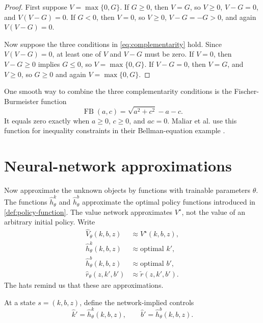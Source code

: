\documentclass[11pt]{article}
\newcommand{\1}{\mathbf{1}}
\begin{document}
\begin{proof}
First suppose \(V=\max\{0,G\}\). If \(G\ge 0\), then \(V=G\), so \(V\ge 0\),
\(V-G=0\), and \(V(V-G)=0\). If \(G<0\), then \(V=0\), so \(V\ge 0\),
\(V-G=-G>0\), and again \(V(V-G)=0\).

Now suppose the three conditions in \cref{eq:complementarity} hold. Since
\(V(V-G)=0\), at least one of \(V\) and \(V-G\) must be zero. If \(V=0\), then
\(V-G\ge 0\) implies \(G\le 0\), so \(V=\max\{0,G\}\). If \(V-G=0\), then
\(V=G\), and \(V\ge 0\), so \(G\ge 0\) and again \(V=\max\{0,G\}\).
\end{proof}

One smooth way to combine the three complementarity conditions is the
Fischer-Burmeister function
\begin{equation}
  \operatorname{FB}(a,c)=\sqrt{a^2+c^2}-a-c.
  \label{eq:fb}
\end{equation}
It equals zero exactly when \(a\ge 0\), \(c\ge 0\), and \(ac=0\). Maliar et al.
use this function for inequality constraints in their Bellman-equation example
\citep[Section 4.5]{maliar2021deep}.

\section{Neural-network approximations}

Now approximate the unknown objects by functions with trainable parameters
\(\theta\). The functions \(\widehat h^k_\theta\) and \(\widehat h^b_\theta\)
approximate the optimal policy functions introduced in
\cref{def:policy-function}. The value network approximates \(V^\star\), not the
value of an arbitrary initial policy.
Write
\begin{align}
  \widehat V_\theta(k,b,z) &\approx V^\star(k,b,z), \label{eq:v-network}\\
  \widehat h^k_\theta(k,b,z) &\approx \text{optimal }k', \label{eq:k-policy-network}\\
  \widehat h^b_\theta(k,b,z) &\approx \text{optimal }b', \label{eq:b-policy-network}\\
  \widehat r_\theta(z,k',b') &\approx \widetilde r(z,k',b').
  \label{eq:rate-network}
\end{align}
The hats remind us that these are approximations.

At a state \(s=(k,b,z)\), define the network-implied controls
\begin{equation}
  \widehat k'=\widehat h^k_\theta(k,b,z),
  \qquad
  \widehat b'=\widehat h^b_\theta(k,b,z).
  \label{eq:network-policies}
\end{equation}
\end{document}
